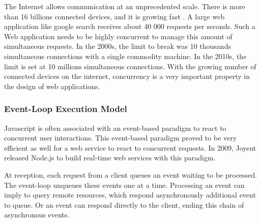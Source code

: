 

The Internet allows communication at an unprecedented scale.
There is more than 16 billions connected devices, and it is growing fast \cite{Hilbert2011}.
A large web application like google search receives about 40 000 requests per seconds.
Such a Web application needs to be highly concurrent to manage this amount of simultaneous requests.
In the 2000s, the limit to break was 10 thousands simultaneous connections with a single commodity machine.
In the 2010s, the limit is set at 10 millions simultaneous connections.
With the growing number of connected devices on the internet, concurrency is a very important property in the design of web applications.

\subsubsection{Event-Loop Execution Model} \label{chapter2:web-as-a-platform:javascript:event-loop}

Javascript is often associated with an event-based paradigm to react to concurrent user interactions.
This event-based paradigm proved to be very efficient as well for a web service to react to concurrent requests.
In 2009, Joyent released Node.js to build real-time web services with this paradigm.


At reception, each request from a client queues an event waiting to be processed.
The event-loop unqueues these events one at a time.
Processing an event can imply to query remote resources, which respond asynchronously additional event to queue.
Or an event can respond directly to the client, ending this chain of asynchronous events.


